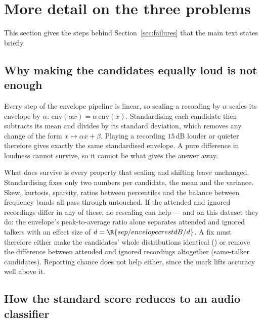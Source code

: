 \section{More detail on the three problems}
\label{app:failures}

This section gives the steps behind Section~\ref{sec:failures} that the main text
states briefly.

\subsection{Why making the candidates equally loud is not enough}
\label{app:conf}

Every step of the envelope pipeline is linear, so scaling a recording by $\alpha$
scales its envelope by $\alpha$: $\mathrm{env}(\alpha x)=\alpha\,\mathrm{env}(x)$.
Standardising each candidate then subtracts its mean and divides by its standard
deviation, which removes any change of the form $x\mapsto\alpha x+\beta$. Playing a
recording $15$\,dB louder or quieter therefore gives exactly the same
standardised envelope. A pure difference in loudness cannot survive, so it cannot
be what gives the answer away.

What does survive is every property that scaling and shifting leave unchanged.
Standardising fixes only two numbers per candidate, the mean and the variance.
Skew, kurtosis, sparsity, ratios between percentiles and the balance between
frequency bands all pass through untouched. If the attended and ignored
recordings differ in any of these, no rescaling can help --- and on this dataset
they do: the envelope's peak-to-average ratio alone separates attended and ignored
talkers with an effect size of $d=\R{sep/envelopecrestdB/d}$. A fix must therefore either make the candidates'
whole distributions identical (\cMat{}) or remove the difference between
attended and ignored recordings altogether (same-talker candidates). Reporting
chance does not help either, since the mark lifts accuracy well above it.

\subsection{How the standard score reduces to an audio classifier}
\label{app:degenerate}

